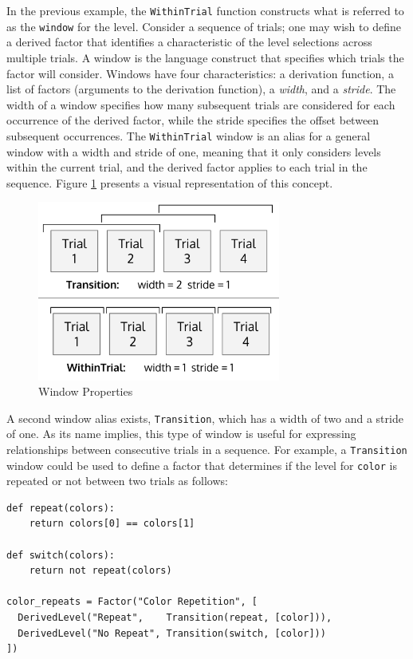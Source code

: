In the previous example, the \texttt{WithinTrial} function constructs what is referred to as the \texttt{window} for the level. Consider a sequence of trials; one may wish to define a derived factor that identifies a characteristic of the level selections across multiple trials. A window is the language construct that specifies which trials the factor will consider. Windows have four characteristics: a derivation function, a list of factors (arguments to the derivation function), a \textit{width}, and a \textit{stride}. The width of a window specifies how many subsequent trials are considered for each occurrence of the derived factor, while the stride specifies the offset between subsequent occurrences. The \texttt{WithinTrial} window is an alias for a general window with a width and stride of one, meaning that it only considers levels within the current trial, and the derived factor applies to each trial in the sequence. Figure \ref{fig:windows} presents a visual representation of this concept.

\begin{figure}[b]
\centering
\centerline{\includegraphics[origin=c,width=8cm]{../figures/windows.png}}
\caption{Window Properties}
\label{fig:windows}
\end{figure}

A second window alias exists, \texttt{Transition}, which has a width of two and a stride of one. As its name implies, this type of window is useful for expressing relationships between consecutive trials in a sequence. For example, a \texttt{Transition} window could be used to define a factor that determines if the level for \texttt{color} is repeated or not between two trials as follows:

\begin{verbatim}
def repeat(colors):
    return colors[0] == colors[1]

def switch(colors):
    return not repeat(colors)

color_repeats = Factor("Color Repetition", [
  DerivedLevel("Repeat",    Transition(repeat, [color])),
  DerivedLevel("No Repeat", Transition(switch, [color]))
])
\end{verbatim}


